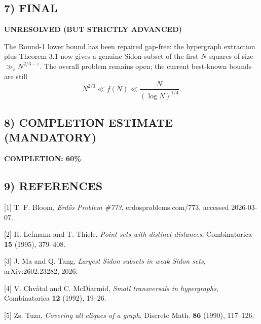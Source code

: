 \subsection*{7) FINAL}
\textbf{UNRESOLVED (BUT STRICTLY ADVANCED)}

The Round-1 lower bound has been repaired gap-free: the hypergraph extraction plus Theorem 3.1 now gives a genuine Sidon subset of the first $N$ squares of size $\gg_\varepsilon N^{2/3-\varepsilon}$. The overall problem remains open; the current best-known bounds are still
\[
N^{2/3}\ll f(N)\ll \frac{N}{(\log N)^{1/4}}.
\]

\subsection*{8) COMPLETION ESTIMATE (MANDATORY)}
\textbf{COMPLETION: 60\%}

\subsection*{9) REFERENCES}
[1] T. F. Bloom, \emph{Erd\H{o}s Problem \#773}, erdosproblems.com/773, accessed 2026-03-07.

[2] H. Lefmann and T. Thiele, \emph{Point sets with distinct distances}, Combinatorica \textbf{15} (1995), 379--408.

[3] J. Ma and Q. Tang, \emph{Largest Sidon subsets in weak Sidon sets}, arXiv:2602.23282, 2026.

[4] V. Chv\'atal and C. McDiarmid, \emph{Small transversals in hypergraphs}, Combinatorica \textbf{12} (1992), 19--26.

[5] Zs. Tuza, \emph{Covering all cliques of a graph}, Discrete Math. \textbf{86} (1990), 117--126.

